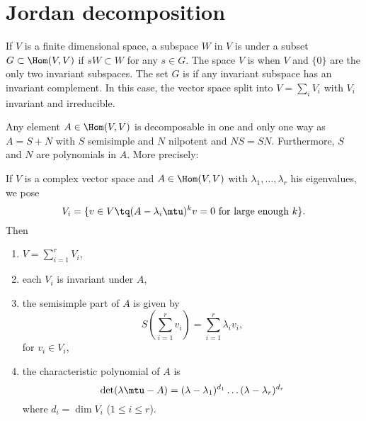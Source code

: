 \section{Jordan decomposition}

If $V$ is a finite dimensional space, a subspace $W$ in $V$ is  under a subset $G\subset\Hom(V,V)$ if $sW\subset W$ for any $s\in G$. The space $V$ is  when $V$ and $\{0\}$ are the only two invariant subspaces. The set $G$ is  if any invariant subspace has an invariant complement. In this case, the vector space split into $V=\sum_iV_i$ with $V_i$ invariant and irreducible.

\begin{theorem}
	Any element $A\in\Hom(V,V)$ is decomposable in one and only one way as $A=S+N$ with $S$ semisimple and $N$ nilpotent and $NS=SN$. Furthermore, $S$ and $N$ are polynomials in $A$. More precisely:

	If $V$ is a complex vector space and $A\in\Hom(V,V)$ with $\lambda_1,\ldots,\lambda_r$ his eigenvalues, we pose
	\[
		V_i=\{ v\in V\tq (A-\lambda_i\mtu)^kv=0 \textrm{ for large enough $k$}\}.
	\]
	Then

	\begin{enumerate}\label{tho:jordan}
		\item $V=\sum_{i=1}^rV_i$,
		\item each $V_i$ is invariant under $A$,
		\item the semisimple part of $A$ is given by
		      \[
			      S(\sum_{i=1}^rv_i)=\sum_{i=1}^r\lambda_iv_i,
		      \]
		      for $v_i\in V_i$,

		\item the characteristic polynomial of $A$ is
		      \[
			      \det(\lambda\mtu-A)=(\lambda-\lambda_1)^{d_1}\ldots(\lambda-\lambda_r)^{d_r}
		      \]
		      where $d_i=\dim V_i$ ($1\leq i\leq r$).
	\end{enumerate}
\end{theorem}

